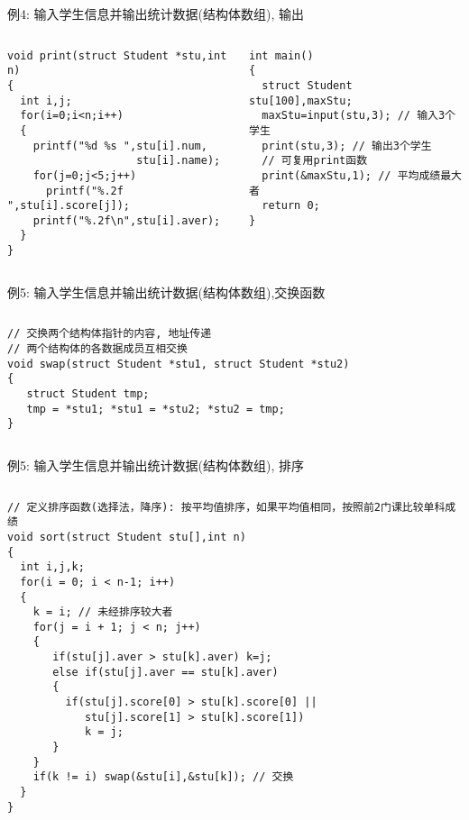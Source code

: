 \begin{frame}{例4: 输入学生信息并输出统计数据(结构体数组), 输出}
\begin{columns}[T]
\begin{lstlisting}
void print(struct Student *stu,int n)
{
  int i,j;
  for(i=0;i<n;i++)
  {
    printf("%d %s ",stu[i].num,
                    stu[i].name);
    for(j=0;j<5;j++) 
      printf("%.2f ",stu[i].score[j]);
    printf("%.2f\n",stu[i].aver);
  }
}
\end{lstlisting}
\begin{lstlisting}
int main()
{ 
  struct Student stu[100],maxStu;
  maxStu=input(stu,3); // 输入3个学生 
  print(stu,3); // 输出3个学生
  // 可复用print函数
  print(&maxStu,1); // 平均成绩最大者
  return 0;
}
\end{lstlisting}
\end{columns}
\medskip
\end{frame}

\begin{frame}{\small 例5: 输入学生信息并输出统计数据(结构体数组),交换函数}
\begin{columns}[T]
\begin{lstlisting}
// 交换两个结构体指针的内容, 地址传递
// 两个结构体的各数据成员互相交换 
void swap(struct Student *stu1, struct Student *stu2)
{
   struct Student tmp;
   tmp = *stu1; *stu1 = *stu2; *stu2 = tmp;
}

\end{lstlisting}
\end{columns}
\medskip
\end{frame}

\begin{frame}{例5: 输入学生信息并输出统计数据(结构体数组), 排序}
\begin{columns}[T]
\begin{lstlisting}
// 定义排序函数(选择法，降序): 按平均值排序，如果平均值相同，按照前2门课比较单科成绩 
void sort(struct Student stu[],int n)            
{
  int i,j,k;
  for(i = 0; i < n-1; i++) 
  {
    k = i; // 未经排序较大者
    for(j = i + 1; j < n; j++)
    {
       if(stu[j].aver > stu[k].aver) k=j;
       else if(stu[j].aver == stu[k].aver)
       { 
         if(stu[j].score[0] > stu[k].score[0] || 
            stu[j].score[1] > stu[k].score[1])
            k = j; 
       } 
    }
    if(k != i) swap(&stu[i],&stu[k]); // 交换
  } 
}
\end{lstlisting}
\end{columns}
\medskip
\end{frame}

